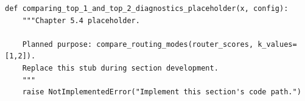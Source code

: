 \begin{lstlisting}[style=bookpython,caption={Planned code placeholder for comparing top 1 and top 2 diagnostics.},label={lst:ch05-comparing-top-1-and-top-2-diagnostics}]
def comparing_top_1_and_top_2_diagnostics_placeholder(x, config):
    """Chapter 5.4 placeholder.

    Planned purpose: compare_routing_modes(router_scores, k_values=[1,2]).
    Replace this stub during section development.
    """
    raise NotImplementedError("Implement this section's code path.")
\end{lstlisting}
